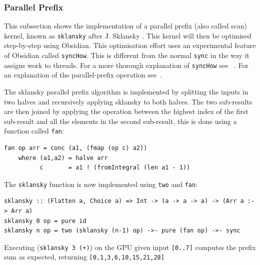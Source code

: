 \subsubsection{Parallel Prefix}
\FloatBarrier

This subsection shows the implementation of a parallel prefix (also called scan) 
kernel, known as {\tt sklansky} after J. Sklansky \cite{Sklansky}.
This kernel will then be optimised step-by-step using Obsidian. This 
optimisation effort uses an experimental feature of Obsidian called {\tt syncHow}. 
This is different from the normal {\tt sync} in the way it assigns work to threads. 
For a more thorough explanation of {\tt syncHow} see ~\cite{JSTECH}.
For an explanation of the parallel-prefix operation see~\cite{BlellochTR90}. 

The sklansky parallel prefix algorithm 
is implemented by splitting the inputs in two halves and recursively 
applying sklansky to both halves. The two sub-results are then 
joined by applying the operation between the highest index of the first
sub-result and all the elements in the second sub-result, this is done 
using a function called {\tt fan}: 

\begin{small}
\begin{verbatim}
fan op arr = conc (a1, (fmap (op c) a2)) 
    where (a1,a2) = halve arr
          c       = a1 ! (fromIntegral (len a1 - 1))
\end{verbatim}
\end{small}
\noindent
The {\tt sklansky} function is now implemented using 
{\tt two} and {\tt fan}: 

\begin{small}
\begin{verbatim}
sklansky :: (Flatten a, Choice a) => Int -> (a -> a -> a) -> (Arr a :-> Arr a) 
sklansky 0 op = pure id
sklansky n op = two (sklansky (n-1) op) ->- pure (fan op) ->- sync
\end{verbatim}
\end{small}

Executing ({\tt sklansky 3 (+)}) on the GPU given input {\tt [0..7]} computes
the prefix sum as expected, returning {\tt [0,1,3,6,10,15,21,28]} 


